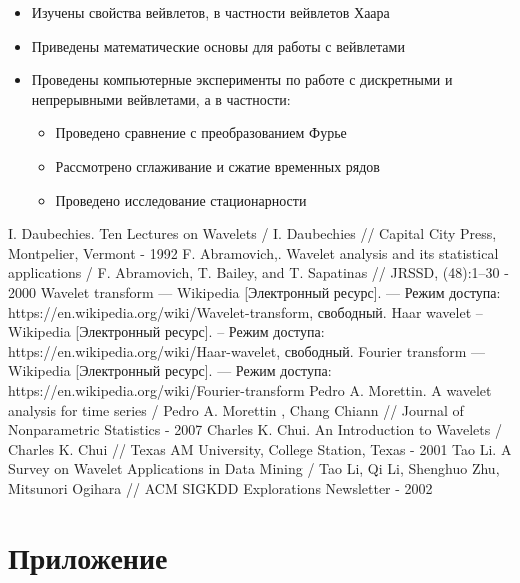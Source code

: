 \documentclass[a4paper]{article}
\newcommand{\anonsection}[1]{ \section*{#1} \addcontentsline{toc}{section}{\numberline {}#1}}
\begin{document}
	\begin{itemize}
		\item Изучены свойства вейвлетов, в частности вейвлетов Хаара
		\item Приведены математические основы для работы с вейвлетами
		\item Проведены компьютерные эксперименты по работе с дискретными и непрерывными вейвлетами, а в частности:
		\begin{itemize}
			\item Проведено сравнение с преобразованием Фурье
			\item Рассмотрено сглаживание и сжатие временных рядов
			\item Проведено исследование стационарности
		\end{itemize}
	\end{itemize}
	
	\newpage
	
	\begin{thebibliography}{8}
		I. Daubechies. Ten Lectures on Wavelets / I. Daubechies // Capital City Press, Montpelier, Vermont - 1992
		F. Abramovich,. Wavelet analysis and its statistical applications / F. Abramovich,                      T. Bailey, and T. Sapatinas // JRSSD, (48):1–30 - 2000
		Wavelet transform --- Wikipedia [Электронный ресурс].  --- Режим доступа: https://en.wikipedia.org/wiki/Wavelet-transform, свободный.
		Haar wavelet – Wikipedia [Электронный ресурс]. – Режим доступа: https://en.wikipedia.org/wiki/Haar-wavelet, свободный.
		Fourier transform --- Wikipedia [Электронный ресурс]. --- Режим доступа: https://en.wikipedia.org/wiki/Fourier-transform
		Pedro A. Morettin. A wavelet analysis for time series / Pedro A. Morettin , Chang Chiann // Journal of Nonparametric Statistics - 2007
		Charles K. Chui. An Introduction to Wavelets / Charles K. Chui // Texas AM University, College Station, Texas - 2001
		Tao Li. A Survey on Wavelet Applications in Data Mining / Tao Li, Qi Li, Shenghuo Zhu, Mitsunori Ogihara // ACM SIGKDD Explorations Newsletter  - 2002
	\end{thebibliography}
	
	\newpage
	
	\anonsection{Приложение}
	
\end{document}
